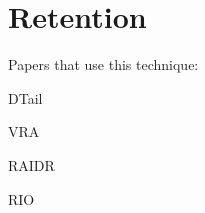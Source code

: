 \section{Retention}
\label{sec:ret}

Papers that use this technique:

DTail\cite{dtail}

VRA

RAIDR\cite{raidr}

RIO\cite{rioparis}
